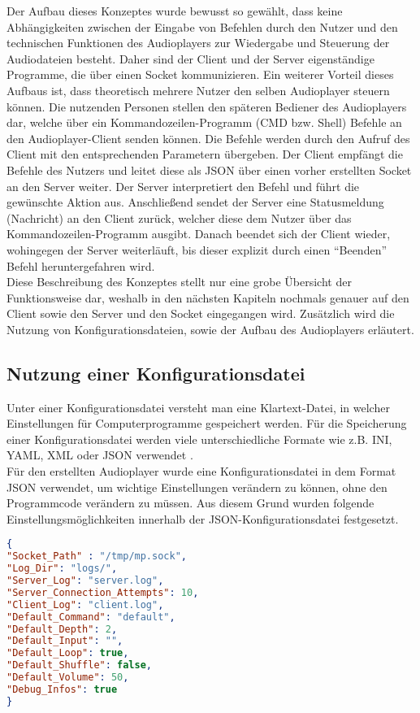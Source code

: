 Der Aufbau dieses Konzeptes wurde bewusst so gewählt, dass keine
Abhängigkeiten zwischen der Eingabe von Befehlen durch den Nutzer
und den technischen Funktionen des Audioplayers zur Wiedergabe und Steuerung
der Audiodateien besteht. Daher sind der Client und der Server eigenständige
Programme, die über einen Socket kommunizieren. Ein weiterer Vorteil dieses
Aufbaus ist, dass theoretisch mehrere Nutzer den selben Audioplayer steuern
können. \newline 
Die nutzenden Personen stellen den späteren Bediener des Audioplayers dar,
welche über ein Kommandozeilen-Programm (\ac{CMD} bzw. Shell) Befehle an den
Audioplayer-Client senden können. Die Befehle werden durch den Aufruf des
Client mit den entsprechenden Parametern übergeben. Der Client empfängt die
Befehle des Nutzers und leitet diese als \ac{JSON} über einen vorher
erstellten Socket an den Server weiter. Der Server interpretiert den Befehl und
führt die gewünschte Aktion aus. Anschließend sendet der Server eine
Statusmeldung (Nachricht) an den Client zurück, welcher diese dem Nutzer über
das Kommandozeilen-Programm ausgibt. Danach beendet sich der Client
wieder, wohingegen der Server weiterläuft, bis dieser explizit durch einen
\enquote{Beenden} Befehl heruntergefahren wird. \\ 
Diese Beschreibung des Konzeptes stellt nur eine grobe Übersicht der
Funktionsweise dar, weshalb in den nächsten Kapiteln nochmals genauer auf
den Client sowie den Server und den Socket eingegangen wird. Zusätzlich wird
die Nutzung von Konfigurationsdateien, sowie der Aufbau des Audioplayers
erläutert.

\subsection{Nutzung einer Konfigurationsdatei}
Unter einer Konfigurationsdatei versteht man eine
Klartext-Datei, in welcher Einstellungen für Computerprogramme gespeichert
werden. Für die Speicherung einer Konfigurationsdatei werden viele
unterschiedliche Formate wie z.B.  \ac{INI}, \ac{YAML}, \ac{XML} oder \ac{JSON}
verwendet \autocite{hard_coding_and_soft_coding_2019} \autocite{lott_2019}. \\ 

Für den erstellten Audioplayer wurde eine Konfigurationsdatei in dem Format
\ac{JSON} verwendet, um wichtige Einstellungen verändern zu können, ohne 
den Programmcode verändern zu müssen. Aus diesem Grund wurden folgende
Einstellungsmöglichkeiten innerhalb der \ac{JSON}-Konfigurationsdatei festgesetzt.
\begin{lstlisting}[language=Json,caption={Konfigurationsdatei des Audioplayers},label={lst:kommfick}]
{
"Socket_Path" : "/tmp/mp.sock",
"Log_Dir": "logs/",
"Server_Log": "server.log",
"Server_Connection_Attempts": 10,
"Client_Log": "client.log",
"Default_Command": "default",
"Default_Depth": 2,
"Default_Input": "",
"Default_Loop": true,
"Default_Shuffle": false,
"Default_Volume": 50,
"Debug_Infos": true
}
\end{lstlisting}

